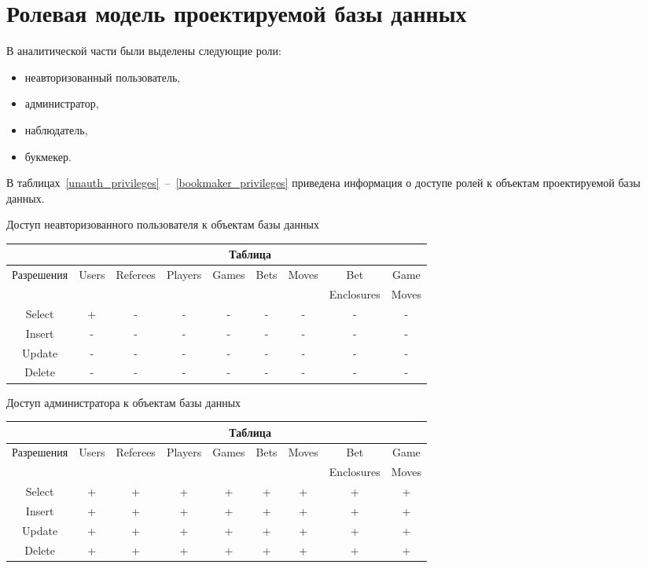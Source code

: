 \section{Ролевая модель проектируемой базы данных}

В аналитической части были выделены следующие роли:
\begin{itemize}
	\item неавторизованный пользователь,
	\item администратор,
	\item наблюдатель,
	\item букмекер.
\end{itemize}

В таблицах~\ref{unauth_privileges}~--~\ref{bookmaker_privileges} приведена информация о доступе ролей к объектам проектируемой базы данных.
\begin{center}
	\begin{threeparttable}
		\captionsetup{justification=raggedright,singlelinecheck=off}
		\caption{\label{unauth_privileges}Доступ неавторизованного пользователя к объектам базы данных}
		\centering
		\begin{tabular}{|c|c|c|c|c|c|c|c|c|}
			\hline
			& \multicolumn{8}{|c|}{Таблица} \\
			\hline
			Разрешения & Users & Referees & Players & Games & Bets & Moves & Bet & Game \\
			&&&&&&& Enclosures & Moves \\
			\hline
			Select & + & - & - & - & - & - & - & - \\
			\hline
			Insert & - & - & - & - & - & - & - & - \\
			\hline
			Update & - & - & - & - & - & - & - & - \\
			\hline
			Delete & - & - & - & - & - & - & - & - \\
			\hline
		\end{tabular}
	\end{threeparttable}
\end{center}
\begin{center}
	\begin{threeparttable}
		\captionsetup{justification=raggedright,singlelinecheck=off}
		\caption{\label{admin_privileges}Доступ администратора к объектам базы данных}
		\centering
		\begin{tabular}{|c|c|c|c|c|c|c|c|c|}
			\hline
			& \multicolumn{8}{|c|}{Таблица} \\
			\hline
			Разрешения & Users & Referees & Players & Games & Bets & Moves & Bet & Game \\
			&&&&&&& Enclosures & Moves \\
			\hline
			Select & + & + & + & + & + & + & + & + \\
			\hline
			Insert& + & + & + & + & + & + & + & + \\
			\hline
			Update & + & + & + & + & + & + & + & + \\
			\hline
			Delete & + & + & + & + & + & + & + & + \\
			\hline
		\end{tabular}
	\end{threeparttable}
\end{center}
